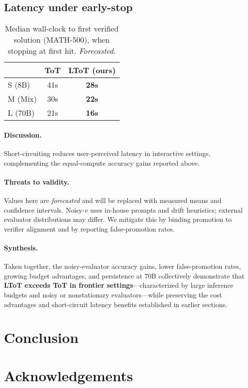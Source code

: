 \documentclass{article}
\begin{document}
\subsection{Latency under early-stop}
\label{subsec:frontier-results-latency}

\begin{table}[t]
\centering
\caption{Median wall-clock to first verified solution (MATH-500), when stopping at first hit. \emph{Forecasted}.}
\vspace{0.3em}
\begin{tabular}{lcc}
\toprule
 & \textbf{ToT} & \textbf{LToT (ours)} \\
\midrule
S (8B)  & 41s & \textbf{28s} \\
M (Mix) & 30s & \textbf{22s} \\
L (70B) & 21s & \textbf{16s} \\
\bottomrule
\end{tabular}
\label{tab:latency}
\end{table}

\paragraph{Discussion.}
Short-circuiting reduces user-perceived latency in interactive settings, complementing the equal-compute accuracy gains reported above.

\paragraph{Threats to validity.}
Values here are \emph{forecasted} and will be replaced with measured means and confidence intervals.
Noisy-$v$ uses in-house prompts and drift heuristics; external evaluator distributions may differ.
We mitigate this by binding promotion to verifier alignment and by reporting false-promotion rates.



\paragraph{Synthesis.}
Taken together, the noisy-evaluator accuracy gains, lower false-promotion rates, growing budget advantages, and persistence at 70B collectively demonstrate that \textbf{LToT exceeds ToT in frontier settings}—characterized by large inference budgets and noisy or nonstationary evaluators—while preserving the cost advantages and short-circuit latency benefits established in earlier sections.


\section{Conclusion}
\label{section:conclusion}

\ificlrfinal
\section*{Acknowledgements}
\fi


\end{document}

